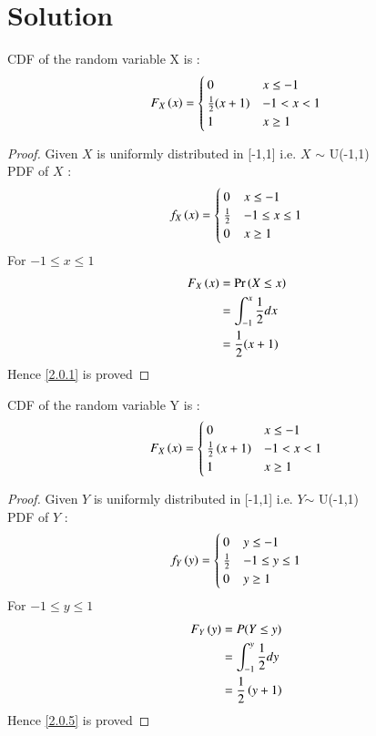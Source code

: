 \documentclass[journal,12pt,twocolumn]{IEEEtran}
\begin{document}
\section{Solution}
\begin{lemma}
 CDF of the random variable X is : 
 \begin{equation}
    F_X\left(x\right)=
    \begin{cases}
    0 & x\leq-1\\
    \frac{1}{2}(x+1) & -1<x<1\\
    1 & x\geq1 
    \end{cases}\label{2.0.1}
 \end{equation}
\end{lemma}
\begin{proof}
Given \(X\) is uniformly distributed in [-1,1] i.e. \(X\) \(\sim\) U(-1,1)
\\PDF of \(X\) : 
\begin{equation}
    f_{X}\left(x\right)=
    \begin{cases}
     0 & x\leq-1\\
     \frac{1}{2} & -1\leq x\leq 1\\
     0 & x\geq1
    \end{cases}
\end{equation}
For  \(-1\leq x\leq 1\)
\begin{align}
  F_{X}\left(x\right)&=\Pr\left(X\leq x\right)\\
  &=\int_{-1}^x\frac{1}{2}dx\\
  &=\frac{1}{2}(x+1)
\end{align}
Hence \eqref{2.0.1} is proved
\end{proof}
\begin{lemma}
 CDF of the random variable Y is : 
 \begin{equation}
    F_X\left(x\right)=
    \begin{cases}
    0 & x\leq-1\\
    \frac{1}{2}\left(x+1\right) & -1<x<1\\
    1 & x\geq1 
    \end{cases}\label{2.0.5}
 \end{equation}
\end{lemma}
\begin{proof}
Given \(Y\) is uniformly distributed in [-1,1] i.e. \(Y\)\(\sim\) U(-1,1)
\\PDF of \(Y\) : 
\begin{equation}
    f_{Y}\left(y\right)=
    \begin{cases}
     0 & y\leq-1\\
     \frac{1}{2} & -1\leq y\leq 1\\
     0 & y\geq1
    \end{cases}
\end{equation}
For  \(-1\leq y\leq 1\)
\begin{align}
  F_{Y}\left(y\right)&=P(Y\leq y)\\
  &=\int_{-1}^y\frac{1}{2}dy\\
  &=\frac{1}{2}\left(y+1\right)
\end{align}
Hence \eqref{2.0.5} is proved
\end{proof}
\end{document}
